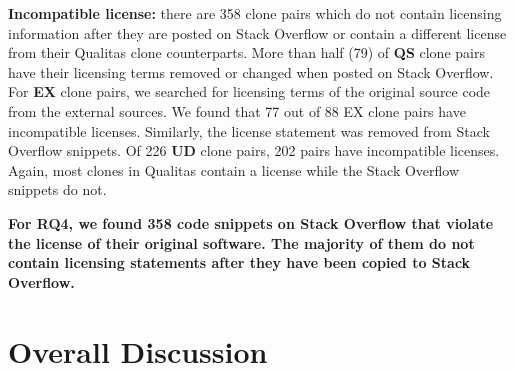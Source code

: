 \documentclass[sigconf,review, anonymous]{acmart}
\begin{document}
\textbf{Incompatible license:} there are 358 clone pairs which do not
contain licensing information after they are posted on Stack Overflow
or contain a different license from their Qualitas clone
counterparts. More than half (79) of \textbf{QS} clone pairs have
their licensing terms removed or changed when posted on Stack
Overflow. For \textbf{EX} clone pairs, we searched for licensing terms of the
original source code from the external sources. We found that 77 out
of 88 EX clone pairs have incompatible licenses.
Similarly, the license statement was removed from Stack Overflow
snippets. Of 226 \textbf{UD} clone pairs, 202 pairs have incompatible
licenses. Again, most clones in Qualitas contain a license
while the Stack Overflow snippets do not.
%

\textbf{For RQ4, we found 358 code snippets on Stack Overflow that
  violate the license of their original software. The majority of them
  do not contain licensing statements after they have been copied to
  Stack Overflow.}

\section{Overall Discussion}
\end{document}
